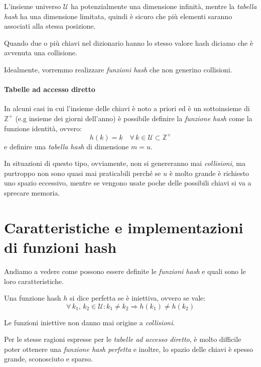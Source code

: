 \begin{note}
    L'insieme universo $\mathcal{U}$ ha potenzialmente una dimensione infinità,
    mentre la \emph{tabella hash} ha una dimensione limitata, quindi è sicuro che
    più elementi saranno associati alla stessa posizione.
\end{note}

\begin{definition}[Collisione]
    Quando due o più chiavi nel dizionario hanno lo stesso valore hash diciamo
    che è avvenuta una collisione.
\end{definition}\noindent
Idealmente, vorremmo realizzare \emph{funzioni hash} che non generino collisioni.

\paragraph{Tabelle ad accesso diretto}
In alcuni casi in cui l'insieme delle chiavi è noto a priori ed è un sottoinsieme
 di $\mathbb{Z}^+$ (e.g insieme dei giorni dell'anno) è possibile
definire la \emph{funzione hash} come la funzione identità, ovvero:
\[h(k)=k\quad\forall\,k\in\mathcal{U}\subset\mathbb{Z}^+\]
e definire una \emph{tabella hash} di dimensione $m=u$.

In situazioni di questo tipo, ovviamente, non si genereranno mai \emph{collisioni},
ma purtroppo non sono quasi mai praticabili perché se $u$ è molto grande è
richiesto uno spazio eccessivo, mentre se vengono usate poche delle possibili
chiavi si va a sprecare memoria.

\section{Caratteristiche e implementazioni di funzioni hash}
Andiamo a vedere come possono essere definite le \emph{funzioni hash} e quali
sono le loro caratteristiche.

\begin{definition}
    Una funzione hash $h$ si dice perfetta se è iniettiva, ovvero se vale:
    \[\forall\,k_1,\,k_2\in\mathcal{U}:k_1\neq k_2\Rightarrow h(k_1)\neq h(k_2)\]
\end{definition}
\begin{note}
    Le funzioni iniettive non danno mai origine a \emph{collisioni}.
\end{note}\noindent
Per le stesse ragioni espresse per le \emph{tabelle ad accesso diretto}, è molto
difficile poter ottenere una \emph{funzione hash perfetta} e inoltre, lo spazio
delle chiavi è spesso grande, sconosciuto e sparso.

